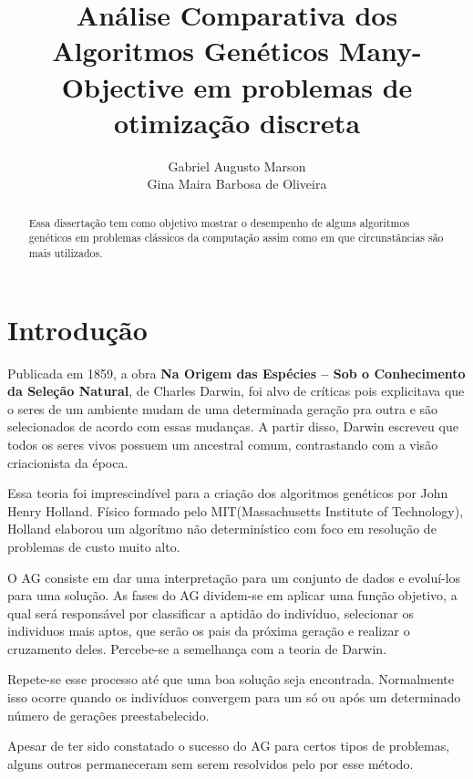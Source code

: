 \documentclass[]{article}
\title{Análise Comparativa dos Algoritmos Genéticos Many-Objective em problemas de otimização discreta}
\author{Gabriel Augusto Marson\\Gina Maira Barbosa de Oliveira }
\begin{document}
\maketitle

\begin{abstract}
	
	\noindent Essa dissertação tem como objetivo mostrar o desempenho de alguns algoritmos genéticos em problemas clássicos da computação assim como em que circunstãncias são mais utilizados.
	
\end{abstract}

\section{Introdução}
	
	Publicada em 1859, a obra \textbf{Na Origem das Espécies – Sob o Conhecimento da Seleção Natural}, de Charles Darwin, foi alvo de críticas pois explicitava que o seres de um ambiente mudam de uma determinada geração pra outra e são selecionados de acordo com essas mudanças. A partir disso, Darwin escreveu que todos os seres vivos possuem um ancestral comum, contrastando com a visão criacionista da época.
	
	Essa teoria foi imprescindível para a criação dos algoritmos genéticos por John Henry Holland. Físico formado pelo MIT(Massachusetts Institute of Technology), Holland elaborou um algorítmo não determinístico com foco em resolução de problemas de custo muito alto.
	
	O AG consiste em dar uma interpretação para um conjunto de dados e evoluí-los para uma solução. As fases do AG dividem-se em aplicar uma função objetivo, a qual será responsável por classificar a aptidão do indivíduo, selecionar os individuos mais aptos, que serão os pais da próxima geração e realizar o cruzamento deles. Percebe-se a semelhança com a teoria de Darwin.
	
	Repete-se esse processo até que uma boa solução seja encontrada. Normalmente isso ocorre quando os indivíduos convergem para um só ou após um determinado número de gerações preestabelecido.
	
	Apesar de ter sido constatado o sucesso do AG para certos tipos de problemas, alguns outros permaneceram sem serem resolvidos pelo por esse método.
	
	
\end{document}
